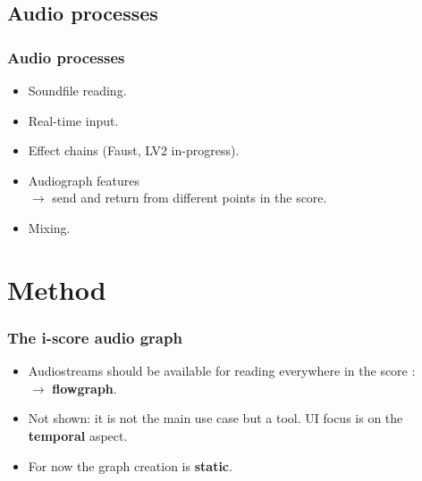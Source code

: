 \documentclass{beamer}
\begin{document}
\subsection{Audio processes}
\begin{frame}	
    \frametitle{Audio processes}    
    \LARGE
    \begin{itemize}
        \item Soundfile reading.
        \item Real-time input.
        \item Effect chains (Faust, LV2 in-progress).
        \item Audiograph features~\\$\rightarrow$ send and return from different points in the score.
        \item Mixing.
    \end{itemize}    
\end{frame}

\section{Method}
\begin{frame}
    \frametitle{The i-score audio graph}    
    \Large
    \begin{itemize}
        \item Audiostreams should be available for reading everywhere in the score : \\ $\rightarrow$ \textbf{flowgraph}.
        \item Not shown: it is not the main use case but a tool. UI focus is on the \textbf{temporal} aspect.
        \item For now the graph creation is \textbf{static}.
    \end{itemize}    
\end{frame}
\end{document}
